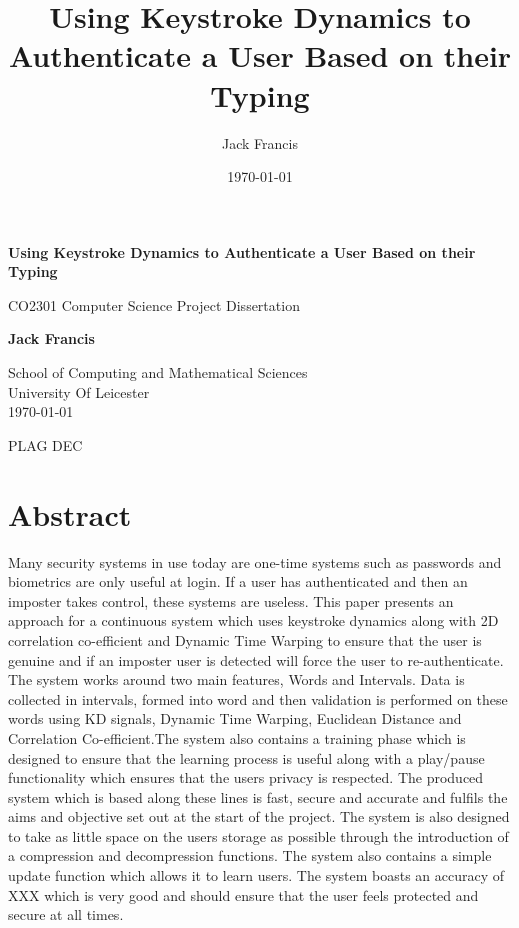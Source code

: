 \documentclass[10pt,a4paper]{report}
\title{Using Keystroke Dynamics to Authenticate a User Based on their Typing}
\author{Jack Francis}
\date{\today}
\begin{document}
\begin{titlepage}
    \begin{center}
        \vspace*{1cm}
            
        \Huge
        \textbf{Using Keystroke Dynamics to Authenticate a User Based on their Typing}
            
        \vspace{0.5cm}
        \LARGE
        CO2301 Computer Science Project Dissertation
            
        \vspace{1.5cm}
            
        \textbf{Jack Francis}
            
        \vfill
            
        \vspace{0.8cm}
            
        \Large
        School of Computing and Mathematical Sciences\\
        University Of Leicester\\
        \today
            
    \end{center}
\end{titlepage}

\newpage
PLAG DEC


\chapter*{Abstract}

Many security systems in use today are one-time systems such as passwords and biometrics are only useful at login. If a user has authenticated and then an imposter takes control, these systems are useless. This paper presents an approach for a continuous system which uses keystroke dynamics along with 2D correlation co-efficient and Dynamic Time Warping to ensure that the user is genuine and if an imposter user is detected will force the user to re-authenticate. The system works around two main features, Words and Intervals. Data is collected in intervals, formed into word and then validation is performed on these words using KD signals, Dynamic Time Warping, Euclidean Distance and Correlation Co-efficient.The system also contains a training phase which is designed to ensure that the learning process is useful along with a play/pause functionality which ensures that the users privacy is respected. The produced system which is based along these lines is fast, secure and accurate and fulfils the aims and objective set out at the start of the project. The system is also designed to take as little space on the users storage as possible through the introduction of a compression and decompression functions. The system also contains a simple update function which allows it to learn users.  The system boasts an accuracy of XXX which is very good and should ensure that the user feels protected and secure at all times.
\end{document}
